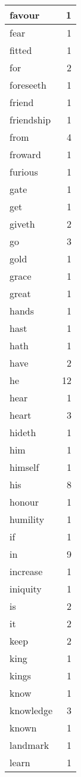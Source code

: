 \begin{center}
\begin{longtable}{l|r}
favour & 1\\ \hline 
fear & 1\\ \hline 
fitted & 1\\ \hline 
for & 2\\ \hline 
foreseeth & 1\\ \hline 
friend & 1\\ \hline 
friendship & 1\\ \hline 
from & 4\\ \hline 
froward & 1\\ \hline 
furious & 1\\ \hline 
gate & 1\\ \hline 
get & 1\\ \hline 
giveth & 2\\ \hline 
go & 3\\ \hline 
gold & 1\\ \hline 
grace & 1\\ \hline 
great & 1\\ \hline 
hands & 1\\ \hline 
hast & 1\\ \hline 
hath & 1\\ \hline 
have & 2\\ \hline 
he & 12\\ \hline 
hear & 1\\ \hline 
heart & 3\\ \hline 
hideth & 1\\ \hline 
him & 1\\ \hline 
himself & 1\\ \hline 
his & 8\\ \hline 
honour & 1\\ \hline 
humility & 1\\ \hline 
if & 1\\ \hline 
in & 9\\ \hline 
increase & 1\\ \hline 
iniquity & 1\\ \hline 
is & 2\\ \hline 
it & 2\\ \hline 
keep & 2\\ \hline 
king & 1\\ \hline 
kings & 1\\ \hline 
know & 1\\ \hline 
knowledge & 3\\ \hline 
known & 1\\ \hline 
landmark & 1\\ \hline 
learn & 1\\ \hline 

\end{longtable}
\end{center}
